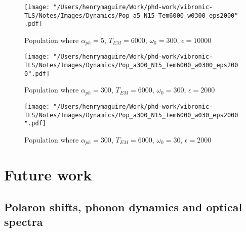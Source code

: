 \documentclass[]{article}
\begin{document}
\begin{figure}[h]
	\centering
	\texttt{[image: "/Users/henrymaguire/Work/phd-work/vibronic-TLS/Notes/Images/Dynamics/Pop\_a5\_N15\_Tem6000\_w0300\_eps2000".pdf]}
	\caption{Population where $\alpha_{ph}=5$, $T_{EM} =6000$, $\omega_0 = 300$, $\epsilon=10000$}
	\label{}
\end{figure}
\begin{figure}[h]
	\centering
	\texttt{[image: "/Users/henrymaguire/Work/phd-work/vibronic-TLS/Notes/Images/Dynamics/Pop\_a300\_N15\_Tem6000\_w0300\_eps2000".pdf]}
	\caption{Population where $\alpha_{ph}=300$, $T_{EM} =6000$, $\omega_0 = 300$, $\epsilon=2000$}
	\label{}
\end{figure}
\begin{figure}[h]
	\centering
	\texttt{[image: "/Users/henrymaguire/Work/phd-work/vibronic-TLS/Notes/Images/Dynamics/Pop\_a300\_N15\_Tem6000\_w030\_eps2000".pdf]}
	\caption{Population where $\alpha_{ph}=300$, $T_{EM} =6000$, $\omega_0 = 30$, $\epsilon=2000$}
	\label{}
\end{figure}
\begin{comment}
\subsection{Validity of RWA}
\begin{itemize}
	\item Comparing \ref{ssec:nrwa} and \ref{ssec:nsec} find regimes where the two different Hamiltonians yield the same dynamics. Within these regimes, do they agree with the secular theories too? Therefore, does secular imply rotating-wave (at least in the dissipators)?
	\item It seems like the underdamped spectral density reduces the temperature dependence of the dynamics. For strong phonon coupling, non-secular is never equivalent to the secular theory.
\end{itemize}
\end{comment}
\section{Future work}

\subsection{Polaron shifts, phonon dynamics and optical spectra}
\end{document}
